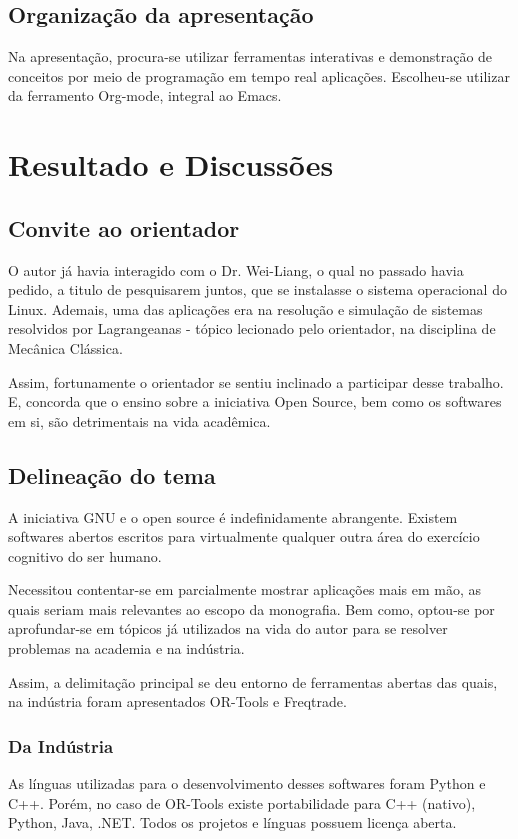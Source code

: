 \documentclass[
12pt,				%
openright,			%
oneside,			%
a4paper,			%
english,			%
french,				%
spanish,			%
brazil,				%
]{abntex2}
\begin{document}
\section{Organização da apresentação}
Na apresentação, procura-se utilizar ferramentas interativas e
demonstração de conceitos por meio de programação em tempo real
aplicações. Escolheu-se utilizar da ferramento Org-mode, integral ao
Emacs.

\chapter{Resultado e Discussões}

\section{Convite ao orientador}
O autor já havia interagido com o Dr. Wei-Liang, o qual no passado
havia pedido, a titulo de pesquisarem juntos, que se instalasse o
sistema operacional do Linux. Ademais, uma das aplicações era na
resolução e simulação de sistemas resolvidos por Lagrangeanas - tópico
lecionado pelo orientador, na disciplina de Mecânica Clássica.

Assim, fortunamente o orientador se sentiu inclinado a participar
desse trabalho. E, concorda que o ensino sobre a iniciativa Open
Source, bem como os softwares em si, são detrimentais na vida acadêmica.

\section{Delineação do tema}

A iniciativa GNU e o open source é indefinidamente abrangente. Existem
softwares abertos escritos para virtualmente qualquer outra área do
exercício cognitivo do ser humano.

Necessitou contentar-se em parcialmente mostrar aplicações mais em
mão, as quais seriam mais relevantes ao escopo da monografia. Bem
como, optou-se por aprofundar-se em tópicos já utilizados na vida do
autor para se resolver problemas na academia e na indústria.

Assim, a delimitação principal se deu entorno de ferramentas abertas
das quais, na indústria foram apresentados OR-Tools e
Freqtrade.

\subsection{Da Indústria}
As línguas utilizadas para o desenvolvimento desses softwares foram
Python e C++. Porém, no caso de OR-Tools existe portabilidade para
C++ (nativo), Python, Java, .NET. Todos os projetos e línguas possuem licença aberta.
\end{document}
